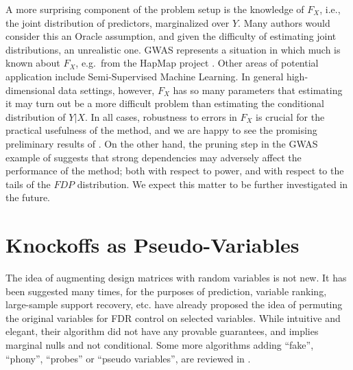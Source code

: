 \documentclass[article,lineno]{biometrika}
\begin{document}
	A more surprising component of the problem setup is the knowledge of $F_X$, i.e., the joint distribution of predictors, marginalized over $Y$.
	Many authors would consider this an Oracle assumption, and given the difficulty of estimating joint distributions, an unrealistic one.
	GWAS represents a situation in which much is known about $F_X$, e.g.\ from the HapMap project \citep{Hapmap2003}.
	Other areas of potential application include Semi-Supervised Machine Learning.
	In general high-dimensional data settings, however, $F_X$ has so many parameters that estimating it may turn out be a more difficult problem than estimating the conditional distribution of $Y|X$.
	In all cases, robustness to errors in $F_X$ is crucial for the practical usefulness of the method, and we are happy to see the promising preliminary results of \cite{CandesPanninggoldmodelX2018}.
	On the other hand, the pruning step in the GWAS example of \cite{SesiaGenehuntinghidden} suggests that strong dependencies may adversely affect the performance of the method; both with respect to power, and with respect to the tails of the $FDP$ distribution.
	We expect this matter to be further investigated in the future.
	
	
	
	
	\section{Knockoffs as Pseudo-Variables}
	The idea of augmenting design matrices with random variables is not new.
	It has been suggested many times, for the purposes of prediction, variable ranking, large-sample support recovery, etc.
	\cite{TusherSignificanceanalysismicroarrays2001} have already proposed the idea of permuting the original variables for \rm{FDR} control on selected variables.
	While intuitive and elegant, their algorithm did not have any provable guarantees, and implies marginal nulls and not conditional.
	Some more algorithms adding ``fake'', ``phony'', ``probes'' or ``pseudo variables'', are reviewed in \cite{GuyonIntroductionVariableFeature2003}.
	
\end{document}
